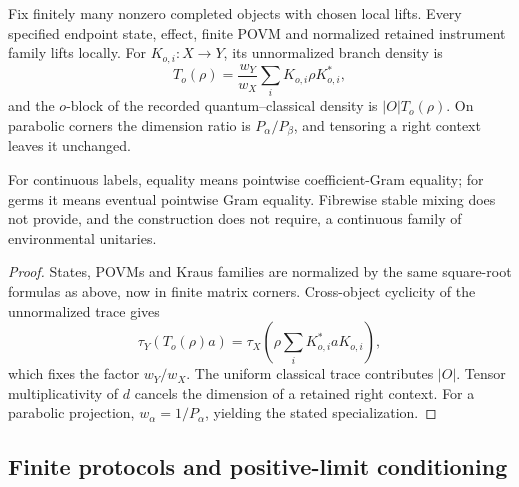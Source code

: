 \begin{theorem}
{\normalfont\statusProved}\quad
Fix finitely many nonzero completed objects with chosen local lifts.  Every
specified endpoint state, effect, finite POVM and normalized retained
instrument family lifts locally.  For
$K_{o,i}:X\to Y$, its unnormalized branch density is
\[
 T_o(\rho)=\frac{w_Y}{w_X}\sum_iK_{o,i}\rho K_{o,i}^*,
\]
and the $o$-block of the recorded quantum--classical density is
$|O|T_o(\rho)$.  On parabolic corners the dimension ratio is
$P_\alpha/P_\beta$, and tensoring a right context leaves it unchanged.
\end{theorem}
\begin{scope}
For continuous labels, equality means pointwise coefficient-Gram equality;
for germs it means eventual pointwise Gram equality.  Fibrewise stable mixing
does not provide, and the construction does not require, a continuous family
of environmental unitaries.
\end{scope}
\begin{proof}
States, POVMs and Kraus families are normalized by the same square-root
formulas as above, now in finite matrix corners.  Cross-object cyclicity of
the unnormalized trace gives
\[
 \tau_Y(T_o(\rho)a)
 =\tau_X\!\left(\rho\sum_iK_{o,i}^*aK_{o,i}\right),
\]
which fixes the factor $w_Y/w_X$.  The uniform classical trace contributes
$|O|$.  Tensor multiplicativity of $d$ cancels the dimension of a retained
right context.  For a parabolic projection,
$w_\alpha=1/P_\alpha$, yielding the stated specialization.
\end{proof}

\subsection{Finite protocols and positive-limit conditioning}

